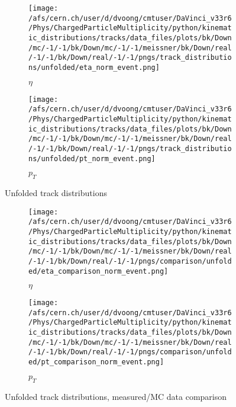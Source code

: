 \begin{figure}[h]
	\begin{subfigure}[h]{0.49\textwidth}
		\texttt{[image: /afs/cern.ch/user/d/dvoong/cmtuser/DaVinci\_v33r6/Phys/ChargedParticleMultiplicity/python/kinematic\_distributions/tracks/data\_files/plots/bk/Down/mc/-1/-1/bk/Down/mc/-1/-1/meissner/bk/Down/real/-1/-1/bk/Down/real/-1/-1/pngs/track\_distributions/unfolded/eta\_norm\_event.png]}
		\caption{$\eta$}
		\label{fig: background corrected track distributions eta}
	\end{subfigure}
	\begin{subfigure}[h]{0.49\textwidth}
		\texttt{[image: /afs/cern.ch/user/d/dvoong/cmtuser/DaVinci\_v33r6/Phys/ChargedParticleMultiplicity/python/kinematic\_distributions/tracks/data\_files/plots/bk/Down/mc/-1/-1/bk/Down/mc/-1/-1/meissner/bk/Down/real/-1/-1/bk/Down/real/-1/-1/pngs/track\_distributions/unfolded/pt\_norm\_event.png]}
		\caption{$p_T$}
		\label{fig: background corrected track distributions pt}
	\end{subfigure}
	\caption{Unfolded track distributions}
	\label{fig: unfolded track distributions}
\end{figure}

\begin{figure}[h]
	\begin{subfigure}[h]{0.49\textwidth}
		\texttt{[image: /afs/cern.ch/user/d/dvoong/cmtuser/DaVinci\_v33r6/Phys/ChargedParticleMultiplicity/python/kinematic\_distributions/tracks/data\_files/plots/bk/Down/mc/-1/-1/bk/Down/mc/-1/-1/meissner/bk/Down/real/-1/-1/bk/Down/real/-1/-1/pngs/comparison/unfolded/eta\_comparison\_norm\_event.png]}
		\caption{$\eta$}
		\label{fig: background corrected track distributions eta}
	\end{subfigure}
	\begin{subfigure}[h]{0.49\textwidth}
		\texttt{[image: /afs/cern.ch/user/d/dvoong/cmtuser/DaVinci\_v33r6/Phys/ChargedParticleMultiplicity/python/kinematic\_distributions/tracks/data\_files/plots/bk/Down/mc/-1/-1/bk/Down/mc/-1/-1/meissner/bk/Down/real/-1/-1/bk/Down/real/-1/-1/pngs/comparison/unfolded/pt\_comparison\_norm\_event.png]}
		\caption{$p_T$}
		\label{fig: background corrected track distributions pt}
	\end{subfigure}
	\caption{Unfolded track distributions, measured/MC data comparison}
	\label{fig: unfolded track distributions comparison}
\end{figure}

